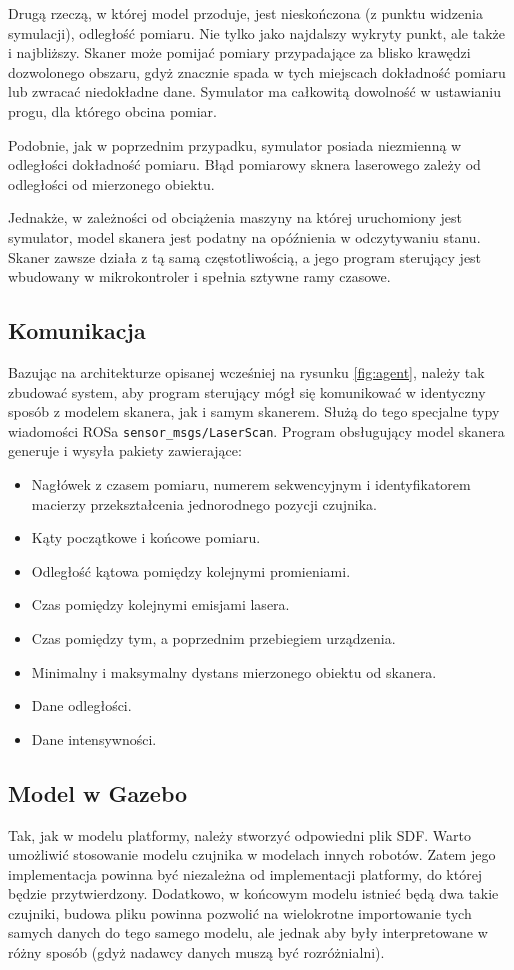 		Drugą rzeczą, w której model przoduje, jest nieskończona (z punktu widzenia symulacji), odległość pomiaru.
		Nie tylko jako najdalszy wykryty punkt, ale także i najbliższy. 
		Skaner może pomijać pomiary przypadające za blisko krawędzi dozwolonego obszaru, gdyż znacznie spada w tych miejscach dokładność pomiaru lub zwracać niedokładne dane.
		Symulator ma całkowitą dowolność w ustawianiu progu, dla którego obcina pomiar.

		Podobnie, jak w poprzednim przypadku, symulator posiada niezmienną w odległości dokładność pomiaru.
		Błąd pomiarowy sknera laserowego zależy od odległości od mierzonego obiektu.

		Jednakże, w zależności od obciążenia maszyny na której uruchomiony jest symulator, model skanera jest podatny na opóźnienia w odczytywaniu stanu.
		Skaner zawsze działa z tą samą częstotliwością, a jego program sterujący jest wbudowany w mikrokontroler i spełnia sztywne ramy czasowe.

	\subsection{Komunikacja}
		Bazując na architekturze opisanej wcześniej na rysunku \ref{fig:agent}, należy tak zbudować system, aby program sterujący mógł się komunikować w identyczny sposób z 
		modelem skanera, jak i samym skanerem.
		Służą do tego specjalne typy wiadomości ROSa \texttt{sensor\_msgs/LaserScan}.
		Program obsługujący model skanera generuje i wysyła pakiety zawierające:
		\begin{itemize}
			\item Nagłówek z czasem pomiaru, numerem sekwencyjnym i identyfikatorem macierzy przekształcenia jednorodnego pozycji czujnika.
			\item Kąty początkowe i końcowe pomiaru.
			\item Odległość kątowa pomiędzy kolejnymi promieniami.
			\item Czas pomiędzy kolejnymi emisjami lasera.
			\item Czas pomiędzy tym, a poprzednim przebiegiem urządzenia.
			\item Minimalny i maksymalny dystans mierzonego obiektu od skanera.
			\item Dane odległości.
			\item Dane intensywności.
		\end{itemize}
		
	\subsection{Model w Gazebo}
		Tak, jak w modelu platformy, należy stworzyć odpowiedni plik SDF. 
		Warto umożliwić stosowanie modelu czujnika w modelach innych robotów. 
		Zatem jego implementacja powinna być niezależna od implementacji platformy, do której będzie przytwierdzony.
		Dodatkowo, w końcowym modelu istnieć będą dwa takie czujniki, budowa pliku powinna pozwolić na wielokrotne importowanie tych samych danych do tego samego modelu, 
		ale jednak aby były interpretowane w różny sposób (gdyż nadawcy danych muszą być rozróżnialni).

